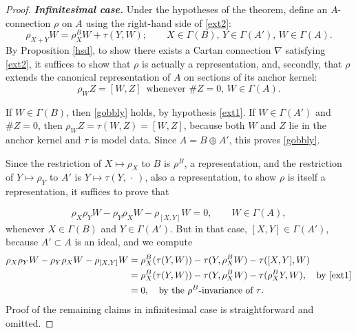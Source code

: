 \documentclass[leqno,12pt]{amsart} %
\begin{document}
\begin{proof}{\em \bfseries Infinitesimal case.} Under the hypotheses of the theorem, define an
  $A$-connection $\rho $ on $A$ using the right-hand side of \eqref{ext2}:
  \begin{equation*}
   \rho_{X + Y}W = \rho^B_XW + \tau(Y, W);\qquad
    X \in \Gamma(B),\,Y \in \Gamma(A'),\,W \in \Gamma(A).
  \end{equation*}
  By Proposition \ref{hsd}, to show there exists a Cartan connection $\nabla $ satisfying
  \eqref{ext2}, it suffices to show that $\rho $ is actually a representation, and,
  secondly, that $\rho $ extends the canonical representation of $A$ on sections of its
  anchor kernel:
  \begin{equation}
    \label{gobbly}
    \rho_WZ = [W, Z]\enspace\text{whenever $\#Z=0$, $W \in \Gamma(A)$.}
  \end{equation}

  If $W \in \Gamma(B)$, then \eqref{gobbly} holds, by hypothesis \eqref{ext1}. If
  $W \in \Gamma(A')$ and $\#Z=0$, then $\rho_WZ=\tau(W,Z)=[W, Z]$, because both $W$ and
  $Z$ lie in the anchor kernel and $\tau $ is model data. Since $A = B \oplus A'$, this
  proves \eqref{gobbly}.

  Since the restriction of $X \mapsto \rho_X $ to $B$ is $\rho^B$, a representation, and
  the restriction of $Y \mapsto \rho_Y $ to $A'$ is $Y \mapsto \tau(Y, \,\cdot\,)$, also a
  representation, to show $\rho $ is itself a representation, it suffices to prove that

  \begin{equation*}
    \rho_X \rho_Y W - \rho_Y \rho_X W - \rho_{[X,Y]}W = 0, \qquad W \in \Gamma(A),
  \end{equation*}
  whenever $X \in \Gamma(B)$ and $Y \in \Gamma(A')$. But in that case,
  $[X, Y] \in \Gamma(A')$, because $A' \subset A$ is an ideal, and we compute
  \begin{align*}
    \rho_X \rho_Y W - \rho_Y \rho_X W - \rho_{[X,Y]}W
       &= \rho^B_X(\tau(Y, W)) - \tau(Y, \rho^B_XW) - \tau([X,Y], W)\\
                     &= \rho^B_X(\tau(Y, W)) - \tau(Y, \rho^B_XW) - \tau(\rho^B_XY, W),
                       \quad\text{by \eqref{ext1}}  \\
                     &= 0,
                       \quad\text{by the $\rho^B$-invariance of $\tau $.}
  \end{align*}
  Proof of the remaining claims in infinitesimal case is straightforward and omitted.


\end{proof}
\end{document}
